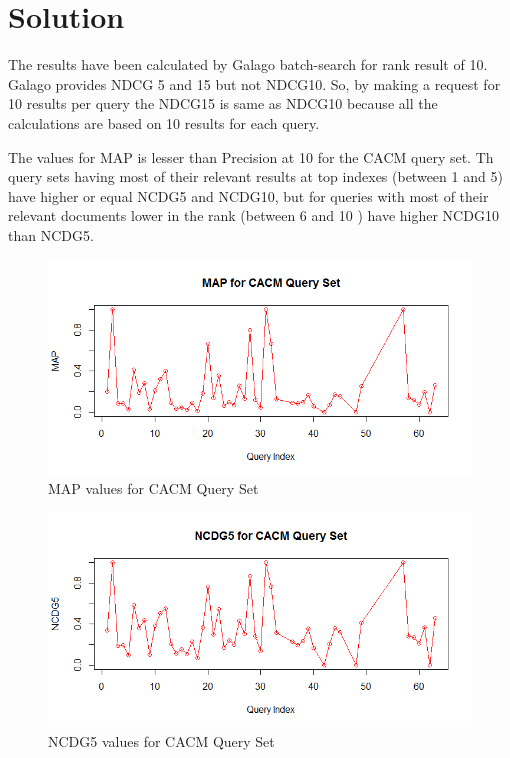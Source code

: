 \documentclass[12pt]{report}
\begin{document}
\section{Solution}
The results have been calculated by Galago batch-search for rank result of 10. Galago provides NDCG 5 and 15 but not NDCG10. So, by making a request for 10 results per query the NDCG15 is same as NDCG10 because all the calculations are based on 10 results for each query.

The values for MAP is lesser than Precision at 10 for the CACM query set. Th query sets having most of their relevant results at top indexes (between 1 and 5) have higher or equal NCDG5 and NCDG10, but for queries with most of their relevant documents lower in the rank (between 6 and 10 ) have higher NCDG10 than NCDG5. 
\begin{figure}[ht]
  \centering
  \includegraphics[width=1\textwidth]{Problem8_5/MAP.png}
  \caption{MAP values for CACM Query Set}
  \label{fig:1}
\end{figure}

\begin{figure}[ht]
  \centering
  \includegraphics[width=1\textwidth]{Problem8_5/NCDG5.png}
  \caption{NCDG5 values for CACM Query Set}
  \label{fig:1}
\end{figure}
\end{document}
